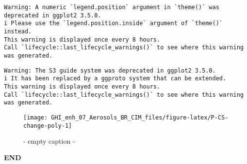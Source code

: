 \documentclass[
  10pt,
  a4paper,oneside]{article}
\begin{document}
\begin{verbatim}
Warning: A numeric `legend.position` argument in `theme()` was deprecated in ggplot2 3.5.0.
i Please use the `legend.position.inside` argument of `theme()` instead.
This warning is displayed once every 8 hours.
Call `lifecycle::last_lifecycle_warnings()` to see where this warning was generated.
\end{verbatim}

\begin{verbatim}
Warning: The S3 guide system was deprecated in ggplot2 3.5.0.
i It has been replaced by a ggproto system that can be extended.
This warning is displayed once every 8 hours.
Call `lifecycle::last_lifecycle_warnings()` to see where this warning was generated.
\end{verbatim}

\begin{figure}[H]

{\centering \texttt{[image: GHI\_enh\_07\_Aerosols\_BR\_CIM\_files/figure-latex/P-CS-change-poly-1]} 

}

\caption{ - empty caption - }\label{fig:P-CS-change-poly}
\end{figure}

\textbf{END}
\end{document}
